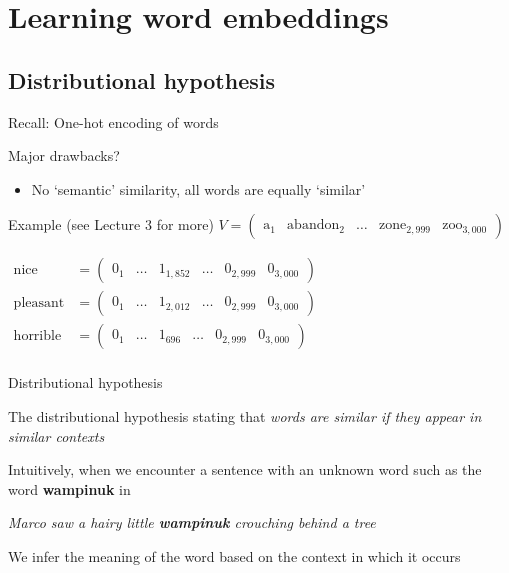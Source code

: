 \documentclass[12pt,aspectratio=169,handout]{beamer}
\begin{document}
\section{Learning word embeddings}





\subsection{Distributional hypothesis}

\begin{frame}{Recall: One-hot encoding of words}
	
Major drawbacks?

\begin{itemize}
	\item No `semantic' similarity, all words are equally `similar'
\end{itemize}

\begin{block}{Example (see Lecture 3 for more)}
	$
	V = \begin{pmatrix}
		\text{a}_1 & \text{abandon}_2 & \ldots & \text{zone}_{2,999} & \text{zoo}_{3,000}
	\end{pmatrix}
	$
	
	\bigskip
	$
	\begin{aligned}
		\text{nice} &= 
		\begin{pmatrix}
			0_1 & \ldots & 1_{1,852} & \ldots & 0_{2,999} & 0_{3,000}
		\end{pmatrix} \\
		\text{pleasant} &= 
		\begin{pmatrix}
			0_1 & \ldots & 1_{2,012} & \ldots & 0_{2,999} & 0_{3,000}
		\end{pmatrix} \\
		\text{horrible} &= 
		\begin{pmatrix}
			0_1 & \ldots & 1_{696} & \ldots & 0_{2,999} & 0_{3,000}
		\end{pmatrix} \\
	\end{aligned}
	$
	
\end{block}


\end{frame}

\begin{frame}{Distributional hypothesis}

The distributional hypothesis stating that \emph{words are similar if they appear in similar contexts}

\begin{example}
Intuitively, when we encounter a sentence with an unknown word such as the word \textbf{wampinuk} in

\pause
\emph{Marco saw a hairy little \textbf{wampinuk} crouching behind a tree}

We infer the meaning of the word based on the context in which it occurs
\end{example}

\end{frame}
\end{document}
